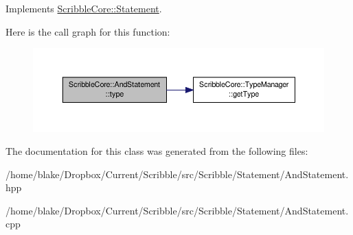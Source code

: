 Implements \hyperlink{class_scribble_core_1_1_statement}{Scribble\-Core\-::\-Statement}.



Here is the call graph for this function\-:
\nopagebreak
\begin{figure}[H]
\begin{center}
\leavevmode
\includegraphics[width=350pt]{class_scribble_core_1_1_and_statement_a957b93b036c51ac746c18ad7fbfcda71_cgraph}
\end{center}
\end{figure}




The documentation for this class was generated from the following files\-:\begin{DoxyCompactItemize}
\item 
/home/blake/\-Dropbox/\-Current/\-Scribble/src/\-Scribble/\-Statement/And\-Statement.\-hpp\item 
/home/blake/\-Dropbox/\-Current/\-Scribble/src/\-Scribble/\-Statement/And\-Statement.\-cpp\end{DoxyCompactItemize}
